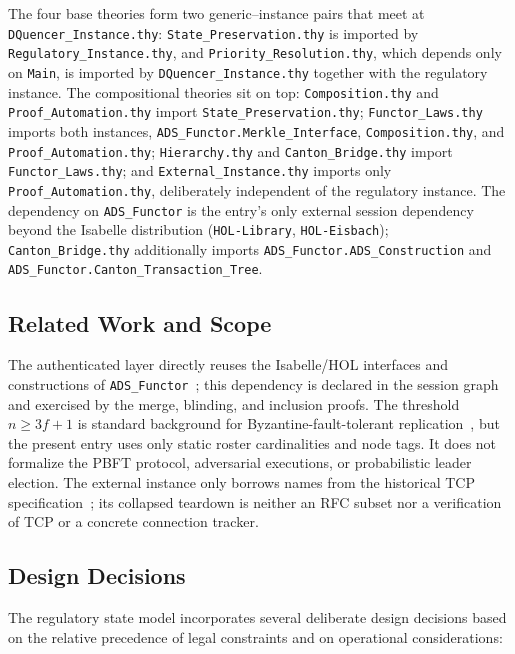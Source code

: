 \documentclass[11pt,a4paper]{article}
\begin{document}
The four base theories form two generic--instance pairs that meet at
\texttt{DQuencer\_Instance.thy}: \texttt{State\_Preservation.thy} is
imported by \texttt{Regulatory\_Instance.thy}, and
\texttt{Priority\_Resolution.thy}, which depends only on \texttt{Main}, is
imported by \texttt{DQuencer\_Instance.thy} together with the regulatory
instance.  The compositional theories sit on top: \texttt{Composition.thy}
and \texttt{Proof\_Automation.thy} import
\texttt{State\_Preservation.thy}; \texttt{Functor\_Laws.thy} imports both
instances, \texttt{ADS\_Functor.Merkle\_Interface},
\texttt{Composition.thy}, and \texttt{Proof\_Automation.thy};
\texttt{Hierarchy.thy} and \texttt{Canton\_Bridge.thy} import
\texttt{Functor\_Laws.thy}; and \texttt{External\_Instance.thy} imports only
\texttt{Proof\_Automation.thy}, deliberately independent of the regulatory
instance.  The dependency on \texttt{ADS\_Functor} is the entry's only
external session dependency beyond the Isabelle distribution
(\texttt{HOL-Library}, \texttt{HOL-Eisbach}); \texttt{Canton\_Bridge.thy}
additionally imports \texttt{ADS\_Functor.ADS\_Construction} and
\texttt{ADS\_Functor.Canton\_Transaction\_Tree}.

\subsection{Related Work and Scope}

The authenticated layer directly reuses the Isabelle/HOL interfaces and
constructions of \texttt{ADS\_Functor}~\cite{ADS_Functor-AFP}; this dependency
is declared in the session graph and exercised by the merge, blinding, and
inclusion proofs.  The threshold $n \geq 3f+1$ is standard background for
Byzantine-fault-tolerant replication~\cite{castro-liskov-1999}, but the present
entry uses only static roster cardinalities and node tags.  It does not
formalize the PBFT protocol, adversarial executions, or probabilistic leader
election.  The external instance only borrows names from the historical TCP
specification~\cite{rfc793}; its collapsed teardown is neither an RFC subset
nor a verification of TCP or a concrete connection tracker.

\subsection{Design Decisions}

The regulatory state model incorporates several deliberate design
decisions based on the relative precedence of legal constraints and on
operational considerations:
\end{document}
